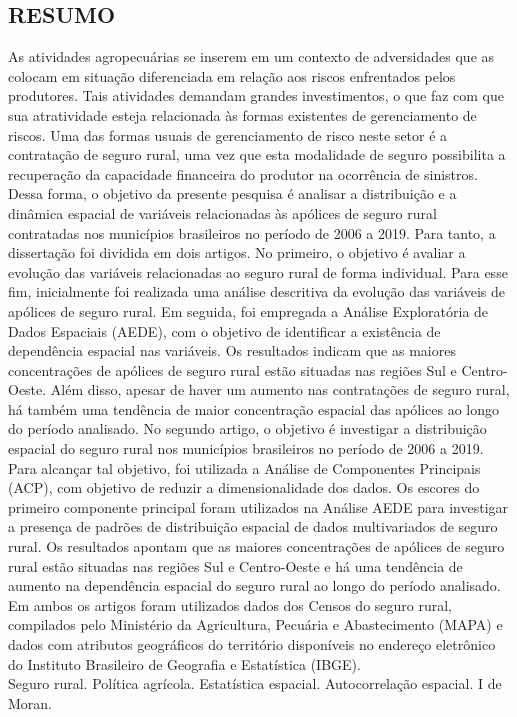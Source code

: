 
\begin{singlespace}
\begin{center}
\section*{RESUMO}
\end{center}
As atividades agropecuárias se inserem em um contexto de adversidades que as colocam em situação diferenciada em relação aos riscos enfrentados pelos produtores. Tais atividades demandam grandes investimentos, o que faz com que sua atratividade esteja relacionada às formas existentes de gerenciamento de riscos. Uma das formas usuais de gerenciamento de risco neste setor é a contratação de seguro rural, uma vez que esta modalidade de seguro possibilita a recuperação da capacidade financeira do produtor na ocorrência de sinistros. Dessa forma, o objetivo da presente pesquisa é analisar a distribuição e a dinâmica espacial de variáveis relacionadas às apólices de seguro rural contratadas nos municípios brasileiros no período de 2006 a 2019. Para tanto, a dissertação foi dividida em dois artigos. No primeiro, o objetivo é avaliar a evolução das variáveis relacionadas ao seguro rural de forma individual. Para esse fim, inicialmente foi realizada uma análise descritiva da evolução das variáveis de apólices de seguro rural. Em seguida, foi empregada a Análise Exploratória de Dados Espaciais (AEDE), com o objetivo de identificar a existência de dependência espacial nas variáveis. Os resultados indicam que as maiores concentrações de apólices de seguro rural estão situadas nas regiões Sul e Centro-Oeste. Além disso, apesar de haver um aumento nas contratações de seguro rural, há também uma tendência de maior concentração espacial das apólices ao longo do período analisado. No segundo artigo, o objetivo é investigar a distribuição espacial do seguro rural nos municípios brasileiros no período de 2006 a 2019. Para alcançar tal objetivo, foi utilizada a Análise de Componentes Principais (ACP), com objetivo de reduzir a dimensionalidade dos dados. Os escores do primeiro componente principal foram  utilizados na Análise AEDE para investigar a presença de padrões de distribuição espacial de dados multivariados de seguro rural. Os resultados apontam que as maiores concentrações de apólices de seguro rural estão situadas nas regiões Sul e Centro-Oeste e há uma tendência de aumento na dependência espacial do seguro rural ao longo do período analisado. Em ambos os artigos foram utilizados dados dos Censos do seguro rural, compilados pelo Ministério da Agricultura, Pecuária e Abastecimento (MAPA) e dados com atributos geográficos do território disponíveis no endereço eletrônico do Instituto Brasileiro de Geografia e Estatística (IBGE).\\
\newline
{} Seguro rural. Política agrícola. Estatística espacial. Autocorrelação espacial. I de Moran.
\end{singlespace}


